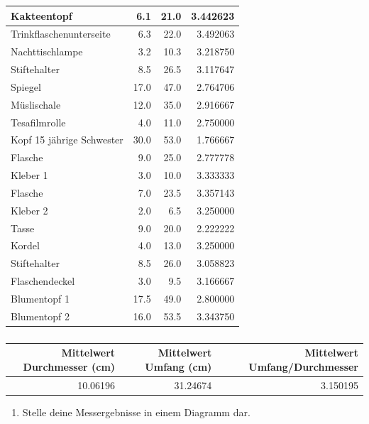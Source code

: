 \documentclass[
  ngerman,
]{book}
\providecommand{\tightlist}{%
  \setlength{\itemsep}{0pt}\setlength{\parskip}{0pt}}
\begin{document}
\begin{table}[H]
\begin{tabular}[t]{l|r|r|r}
\hline
Kakteentopf & 6.1 & 21.0 & 3.442623\\
\hline
Trinkflaschenunterseite & 6.3 & 22.0 & 3.492063\\
\hline
Nachttischlampe & 3.2 & 10.3 & 3.218750\\
\hline
Stiftehalter & 8.5 & 26.5 & 3.117647\\
\hline
Spiegel & 17.0 & 47.0 & 2.764706\\
\hline
Müslischale & 12.0 & 35.0 & 2.916667\\
\hline
Tesafilmrolle & 4.0 & 11.0 & 2.750000\\
\hline
Kopf 15 jährige Schwester & 30.0 & 53.0 & 1.766667\\
\hline
Flasche & 9.0 & 25.0 & 2.777778\\
\hline
Kleber 1 & 3.0 & 10.0 & 3.333333\\
\hline
Flasche & 7.0 & 23.5 & 3.357143\\
\hline
Kleber 2 & 2.0 & 6.5 & 3.250000\\
\hline
Tasse & 9.0 & 20.0 & 2.222222\\
\hline
Kordel & 4.0 & 13.0 & 3.250000\\
\hline
Stiftehalter & 8.5 & 26.0 & 3.058823\\
\hline
Flaschendeckel & 3.0 & 9.5 & 3.166667\\
\hline
Blumentopf 1 & 17.5 & 49.0 & 2.800000\\
\hline
Blumentopf 2 & 16.0 & 53.5 & 3.343750\\
\hline
\end{tabular}
\end{table}

\hypertarget{section-24}{%
\subsubsection*{}\label{section-24}}

\begin{table}[H]
\centering
\begin{tabular}[t]{r|r|r}
\hline
Mittelwert Durchmesser (cm) & Mittelwert Umfang (cm) & Mittelwert Umfang/Durchmesser\\
\hline
10.06196 & 31.24674 & 3.150195\\
\hline
\end{tabular}
\end{table}

\begin{enumerate}
\def\labelenumi{\arabic{enumi}.}
\setcounter{enumi}{2}
\tightlist
\item
  Stelle deine Messergebnisse in einem Diagramm dar.
\end{enumerate}
\end{document}
